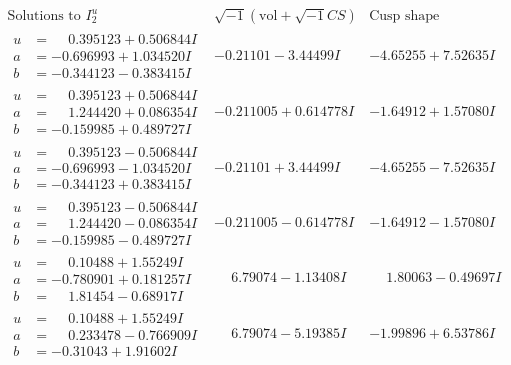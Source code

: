 \documentclass[1p]{elsarticle_modified}
\theoremstyle{definition}
\newcommand{\I}{\sqrt{-1}}
\begin{document}
$$\begin{array}{c|c|c}  
\text{Solutions to }I^u_{2}& \I (\text{vol} + \sqrt{-1}CS) & \text{Cusp shape}\\
 \hline 
\begin{aligned}
u &= \phantom{-}0.395123 + 0.506844 I \\
a &= -0.696993 + 1.034520 I \\
b &= -0.344123 - 0.383415 I\end{aligned}
 & -0.21101 - 3.44499 I & -4.65255 + 7.52635 I \\ \hline\begin{aligned}
u &= \phantom{-}0.395123 + 0.506844 I \\
a &= \phantom{-}1.244420 + 0.086354 I \\
b &= -0.159985 + 0.489727 I\end{aligned}
 & -0.211005 + 0.614778 I & -1.64912 + 1.57080 I \\ \hline\begin{aligned}
u &= \phantom{-}0.395123 - 0.506844 I \\
a &= -0.696993 - 1.034520 I \\
b &= -0.344123 + 0.383415 I\end{aligned}
 & -0.21101 + 3.44499 I & -4.65255 - 7.52635 I \\ \hline\begin{aligned}
u &= \phantom{-}0.395123 - 0.506844 I \\
a &= \phantom{-}1.244420 - 0.086354 I \\
b &= -0.159985 - 0.489727 I\end{aligned}
 & -0.211005 - 0.614778 I & -1.64912 - 1.57080 I \\ \hline\begin{aligned}
u &= \phantom{-}0.10488 + 1.55249 I \\
a &= -0.780901 + 0.181257 I \\
b &= \phantom{-}1.81454 - 0.68917 I\end{aligned}
 & \phantom{-}6.79074 - 1.13408 I & \phantom{-}1.80063 - 0.49697 I \\ \hline\begin{aligned}
u &= \phantom{-}0.10488 + 1.55249 I \\
a &= \phantom{-}0.233478 - 0.766909 I \\
b &= -0.31043 + 1.91602 I\end{aligned}
 & \phantom{-}6.79074 - 5.19385 I & -1.99896 + 6.53786 I \\ \hline\begin{aligned}

\end{aligned}
\end{array}$$
\end{document}
